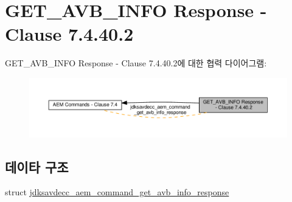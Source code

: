 \hypertarget{group__command__get__avb__info__response}{}\section{G\+E\+T\+\_\+\+A\+V\+B\+\_\+\+I\+N\+FO Response -\/ Clause 7.4.40.2}
\label{group__command__get__avb__info__response}
G\+E\+T\+\_\+\+A\+V\+B\+\_\+\+I\+N\+FO Response -\/ Clause 7.4.40.2에 대한 협력 다이어그램\+:
\nopagebreak
\begin{figure}[H]
\begin{center}
\leavevmode
\includegraphics[width=350pt]{group__command__get__avb__info__response}
\end{center}
\end{figure}
\subsection*{데이타 구조}
\begin{DoxyCompactItemize}
\item 
struct \hyperlink{structjdksavdecc__aem__command__get__avb__info__response}{jdksavdecc\+\_\+aem\+\_\+command\+\_\+get\+\_\+avb\+\_\+info\+\_\+response}
\end{DoxyCompactItemize}
